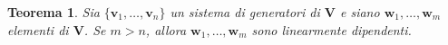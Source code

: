 \documentclass{article}
\theoremstyle{plain}
\newtheorem{thm}{Teorema}[section]
\theoremstyle{definition}
\theoremstyle{remark}
\begin{document}
\begin{bxthm}
\begin{thm}\label{thm:difficilissimo}
    Sia \( \{\mathbf{v}_1, \ldots, \mathbf{v}_n\} \) un sistema di generatori di \( \mathbf{V} \) e siano \( \mathbf{w}_1, \ldots, \mathbf{w}_m \) elementi di \( \mathbf{V} \). 
    Se \( m > n \), allora \( \mathbf{w}_1, \ldots, \mathbf{w}_m \) sono linearmente dipendenti.
\end{thm}
\end{bxthm}
%
%
%
\end{document}
